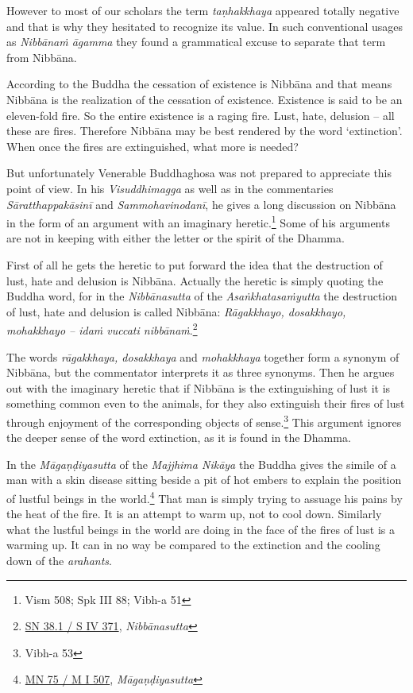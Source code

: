However to most of our scholars the term \emph{taṇhakkhaya} appeared totally negative and that is why they hesitated to recognize its value. In such conventional usages as \emph{Nibbānaṁ āgamma} they found a grammatical excuse to separate that term from Nibbāna.

According to the Buddha the cessation of existence is Nibbāna and that means Nibbāna is the realization of the cessation of existence. Existence is said to be an eleven-fold fire. So the entire existence is a raging fire. Lust, hate, delusion -- all these are fires. Therefore Nibbāna may be best rendered by the word `extinction'. When once the fires are extinguished, what more is needed?

But unfortunately Venerable Buddhaghosa was not prepared to appreciate this point of view. In his \emph{Visuddhimagga} as well as in the commentaries \emph{Sāratthappakāsinī} and \emph{Sammohavinodanī}, he gives a long discussion on Nibbāna in the form of an argument with an imaginary heretic.\footnote{Vism 508; Spk III 88; Vibh-a 51} Some of his arguments are not in keeping with either the letter or the spirit of the Dhamma.

First of all he gets the heretic to put forward the idea that the destruction of lust, hate and delusion is Nibbāna. Actually the heretic is simply quoting the Buddha word, for in the \emph{Nibbānasutta} of the \emph{Asaṅkhatasaṁyutta} the destruction of lust, hate and delusion is called Nibbāna: \emph{Rāgakkhayo, dosakkhayo, mohakkhayo -- idaṁ vuccati nibbānaṁ}.\footnote{\href{https://suttacentral.net/sn38.1/pli/ms}{SN 38.1 / S IV 371}, \emph{Nibbānasutta}}

The words \emph{rāgakkhaya, dosakkhaya} and \emph{mohakkhaya} together form a synonym of Nibbāna, but the commentator interprets it as three synonyms. Then he argues out with the imaginary heretic that if Nibbāna is the extinguishing of lust it is something common even to the animals, for they also extinguish their fires of lust through enjoyment of the corresponding objects of sense.\footnote{Vibh-a 53} This argument ignores the deeper sense of the word extinction, as it is found in the Dhamma.

In the \emph{Māgaṇḍiyasutta} of the \emph{Majjhima Nikāya} the Buddha gives the simile of a man with a skin disease sitting beside a pit of hot embers to explain the position of lustful beings in the world.\footnote{\href{https://suttacentral.net/mn75/pli/ms}{MN 75 / M I 507}, \emph{Māgaṇḍiyasutta}} That man is simply trying to assuage his pains by the heat of the fire. It is an attempt to warm up, not to cool down. Similarly what the lustful beings in the world are doing in the face of the fires of lust is a warming up. It can in no way be compared to the extinction and the cooling down of the \emph{arahants}.

